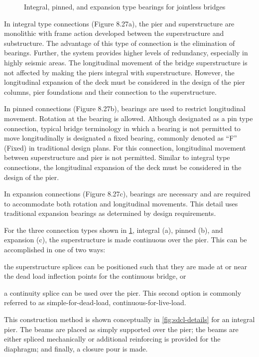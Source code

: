 \begin{figure}
  \caption{Integral, pinned, and expansion type bearings for jointless bridges}
  \label{fig:bearing-jointless-bridges}
\end{figure}

In integral type connections (Figure 8.27a), the pier and superstructure are monolithic with frame action developed between the superstructure and substructure. The advantage of this type of connection is the elimination of bearings. Further, the system provides higher levels of redundancy, especially in highly seismic areas. The longitudinal movement of the bridge superstructure is not affected by making the piers integral with superstructure. However, the longitudinal expansion of the deck must be considered in the design of the pier columns, pier foundations and their connection to the superstructure.

In pinned connections (Figure 8.27b), bearings are used to restrict longitudinal movement. Rotation at the bearing
is allowed. Although designated as a pin type connection, typical bridge terminology in which a bearing is not
permitted to move longitudinally is designated a fixed bearing, commonly denoted as “F” (Fixed) in traditional design
plans. For this connection, longitudinal movement between superstructure and pier is not permitted. Similar to
integral type connections, the longitudinal expansion of the deck must be considered in the design of the pier.

In expansion connections (Figure 8.27c), bearings are necessary and are required to accommodate both rotation
and longitudinal movements. This detail uses traditional expansion bearings as determined by design requirements.

For the three connection types shown in \cref{fig:bearing-jointless-bridges}, integral (a), pinned (b), and expansion (c), the superstructure
is made continuous over the pier. This can be accomplished in one of two ways: 
\begin{enumerate*}
  \item the superstructure splices can be positioned such that they are made at or near the dead load inflection points for the continuous bridge, or 
  \item a continuity splice can be used over the pier. This second option is commonly referred to as simple-for-dead-load, continuous-for-live-load. 
\end{enumerate*}
This construction method is shown conceptually in \cref{fig:sdcl-details} for an integral pier. The beams are placed as simply supported over the pier; the beams are either spliced mechanically or additional reinforcing is provided for the diaphragm; and finally, a closure pour is made.

